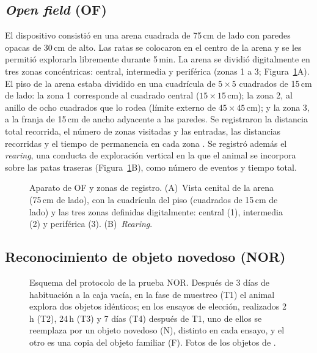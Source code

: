 \FloatBarrier
\subsection{\textit{Open field} (OF)}\label{sec:of}

El dispositivo consistió en una arena cuadrada de 75\,cm de lado con paredes opacas de 30\,cm de alto. Las ratas se colocaron en el centro de la arena y se les permitió explorarla libremente durante 5\,min. La arena se dividió digitalmente en tres zonas concéntricas: central, intermedia y periférica (zonas 1 a 3; Figura~\ref{fig:of-esquema}A). El piso de la arena estaba dividido en una cuadrícula de $5 \times 5$ cuadrados de 15\,cm de lado: la zona 1 corresponde al cuadrado central ($15 \times 15$\,cm); la zona 2, al anillo de ocho cuadrados que lo rodea (límite externo de $45 \times 45$\,cm); y la zona 3, a la franja de 15\,cm de ancho adyacente a las paredes. Se registraron la distancia total recorrida, el número de zonas visitadas y las entradas, las distancias recorridas y el tiempo de permanencia en cada zona \cite{kruse2019sucrose}. Se registró además el \textit{rearing}, una conducta de exploración vertical en la que el animal se incorpora sobre las patas traseras \cite{lever2006rearing} (Figura~\ref{fig:of-esquema}B), como número de eventos y tiempo total.

\begin{figure}[H]
  \centering
  \caption[Aparato de OF y zonas de registro]{Aparato de OF y zonas de registro. (A)~Vista cenital de la arena (75\,cm de lado), con la cuadrícula del piso (cuadrados de 15\,cm de lado) y las tres zonas definidas digitalmente: central (1), intermedia (2) y periférica (3). (B)~\textit{Rearing}.}
  \label{fig:of-esquema}
\end{figure}

\FloatBarrier
\subsection{Reconocimiento de objeto novedoso (NOR)}\label{sec:nor}

\begin{figure}[htbp]
  \centering
  \caption[Esquema del protocolo de la prueba NOR]{Esquema del protocolo de la prueba NOR. Después de 3 días de habituación a la caja vacía, en la fase de muestreo (T1) el animal explora dos objetos idénticos; en los ensayos de elección, realizados 2\,h (T2), 24\,h (T3) y 7 días (T4) después de T1, uno de ellos se reemplaza por un objeto novedoso (N), distinto en cada ensayo, y el otro es una copia del objeto familiar (F). Fotos de los objetos de \cite{coirini2022sucrose}.}
  \label{fig:nor-esquema}
\end{figure}



